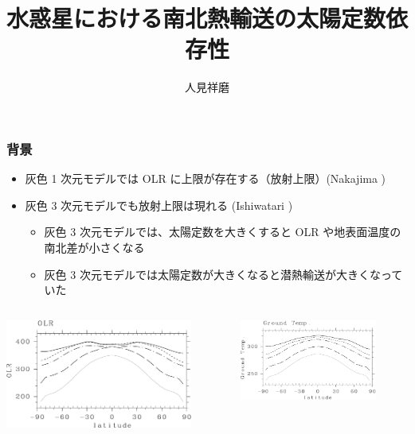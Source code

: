 \documentclass[aspectratio=149,9pt,fleqn]{beamer}
\institute{北海道大学大学院理学院 地球流体力学研究室 M2}
\author{人見祥磨}
\title{水惑星における南北熱輸送の太陽定数依存性}
\begin{document}
\maketitle

\begin{frame}
	\frametitle{背景}
	\begin{itemize}
		\item 灰色 1 次元モデルでは OLR に上限が存在する（放射上限）(Nakajima )
		\item 灰色 3 次元モデルでも放射上限は現れる (Ishiwatari )
			\begin{itemize}
				\item 灰色 3 次元モデルでは、太陽定数を大きくすると OLR や地表面温度の南北差が小さくなる
				\item 灰色 3 次元モデルでは太陽定数が大きくなると潜熱輸送が大きくなっていた
			\end{itemize}
	\end{itemize}
	\begin{columns}[b,onlytextwidth]
		\begin{column}{.45\textwidth}
				\includegraphics[width=\textwidth]{i20024a.pdf}
		\end{column}
		\begin{column}{.45\textwidth}
			\begin{figure}
				\includegraphics[width=\textwidth]{i20024b.pdf}

\end{figure}
\end{column}
\end{columns}
\end{frame}
\end{document}
